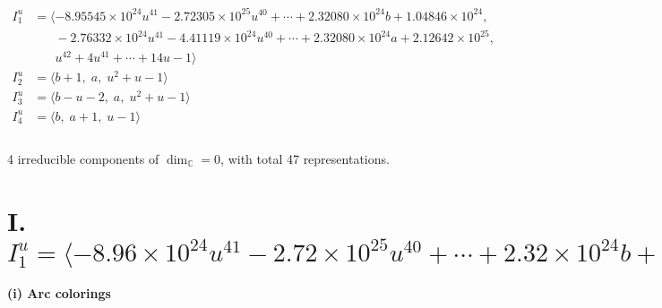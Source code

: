 \documentclass[1p]{elsarticle_modified}
\theoremstyle{definition}
\begin{document}
\begin{align*}
I^u_{1}&=\langle 
-8.95545\times10^{24} u^{41}-2.72305\times10^{25} u^{40}+\cdots+2.32080\times10^{24} b+1.04846\times10^{24},\\
\phantom{I^u_{1}}&\phantom{= \langle  }-2.76332\times10^{24} u^{41}-4.41119\times10^{24} u^{40}+\cdots+2.32080\times10^{24} a+2.12642\times10^{25},\\
\phantom{I^u_{1}}&\phantom{= \langle  }u^{42}+4 u^{41}+\cdots+14 u-1\rangle \\
I^u_{2}&=\langle 
b+1,\;a,\;u^2+u-1\rangle \\
I^u_{3}&=\langle 
b- u-2,\;a,\;u^2+u-1\rangle \\
I^u_{4}&=\langle 
b,\;a+1,\;u-1\rangle \\
\\
\end{align*}
\raggedright * 4 irreducible components of $\dim_{\mathbb{C}}=0$, with total 47 representations.\\
\newpage
\renewcommand{\arraystretch}{1}
\centering \section*{I. $I^u_{1}= \langle -8.96\times10^{24} u^{41}-2.72\times10^{25} u^{40}+\cdots+2.32\times10^{24} b+1.05\times10^{24},\;-2.76\times10^{24} u^{41}-4.41\times10^{24} u^{40}+\cdots+2.32\times10^{24} a+2.13\times10^{25},\;u^{42}+4 u^{41}+\cdots+14 u-1 \rangle$}
\flushleft \textbf{(i) Arc colorings}\\
\end{document}
